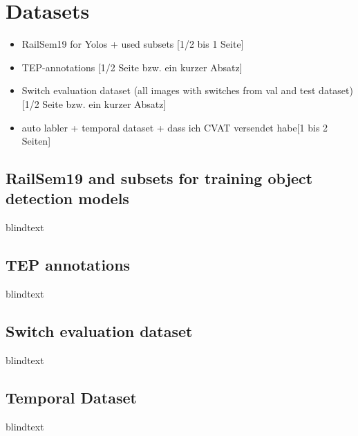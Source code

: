 \section{Datasets}

\begin{itemize}
    \item RailSem19 for Yolos + used subsets [1/2 bis 1 Seite]
    \item TEP-annotations [1/2 Seite bzw. ein kurzer Absatz]
    \item Switch evaluation dataset (all images with switches from val and test dataset) [1/2 Seite bzw. ein kurzer Absatz]
    \item auto labler + temporal dataset + dass ich CVAT versendet habe[1 bis 2 Seiten]
\end{itemize}

\subsection{RailSem19 and subsets for training object detection models}

blindtext

\subsection{TEP annotations}

blindtext

\subsection{Switch evaluation dataset}

blindtext

\subsection{Temporal Dataset}

blindtext
